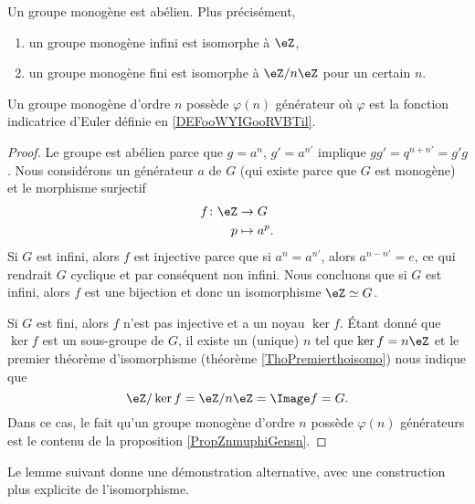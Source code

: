 \begin{theorem}
    Un groupe monogène est abélien. Plus précisément,
    \begin{enumerate}
        \item
            un groupe monogène infini est isomorphe à \( \eZ\),
        \item
            un groupe monogène fini est isomorphe à \( \eZ/n\eZ\) pour un certain \( n\).
    \end{enumerate}
    Un groupe monogène d'ordre \( n\) possède \( \varphi(n)\) générateur où \( \varphi\) est la fonction indicatrice d'Euler définie en \ref{DEFooWYIGooRVBTil}.
\end{theorem}

\begin{proof}
    Le groupe est abélien parce que $g=a^n$, \( g'=a^{n'}\) implique \( gg'=q^{n+n'}=g'g\). Nous considérons un générateur \( a\) de \( G\) (qui existe parce que $G$ est monogène) et le morphisme surjectif
    \begin{equation}
        \begin{aligned}
            f\colon \eZ&\to G \\
            p&\mapsto a^p. 
        \end{aligned}
    \end{equation}
    Si \( G\) est infini, alors \( f\) est injective parce que si \( a^n=a^{n'}\), alors \( a^{n-n'}=e\), ce qui rendrait \( G\) cyclique et par conséquent non infini. Nous concluons que si \( G\) est infini, alors \( f\) est une bijection et donc un isomorphisme \( \eZ\simeq G\).

    Si \( G\) est fini, alors \( f\) n'est pas injective et a un noyau \( \ker f\). Étant donné que \( \ker f\) est un sous-groupe de \( G\), il existe un (unique) \( n\) tel que \( \ker f=n\eZ\) et le premier théorème d'isomorphisme (théorème \ref{ThoPremierthoisomo}) nous indique que
    \begin{equation}
        \eZ/\ker f=\eZ/n\eZ=\Image f=G.
    \end{equation}
    Dans ce cas, le fait qu'un groupe monogène d'ordre \( n\) possède \( \varphi(n)\) générateurs est le contenu de la proposition \ref{PropZnmuphiGensn}.
\end{proof}


Le lemme suivant donne une démonstration alternative, avec une construction plus explicite de l'isomorphisme.

